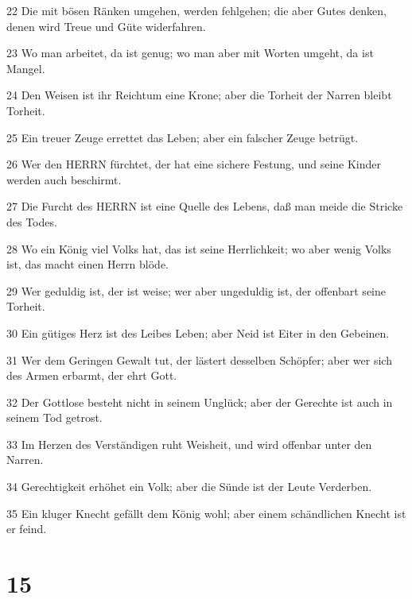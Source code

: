 \par 22 Die mit bösen Ränken umgehen, werden fehlgehen; die aber Gutes denken, denen wird Treue und Güte widerfahren.
\par 23 Wo man arbeitet, da ist genug; wo man aber mit Worten umgeht, da ist Mangel.
\par 24 Den Weisen ist ihr Reichtum eine Krone; aber die Torheit der Narren bleibt Torheit.
\par 25 Ein treuer Zeuge errettet das Leben; aber ein falscher Zeuge betrügt.
\par 26 Wer den HERRN fürchtet, der hat eine sichere Festung, und seine Kinder werden auch beschirmt.
\par 27 Die Furcht des HERRN ist eine Quelle des Lebens, daß man meide die Stricke des Todes.
\par 28 Wo ein König viel Volks hat, das ist seine Herrlichkeit; wo aber wenig Volks ist, das macht einen Herrn blöde.
\par 29 Wer geduldig ist, der ist weise; wer aber ungeduldig ist, der offenbart seine Torheit.
\par 30 Ein gütiges Herz ist des Leibes Leben; aber Neid ist Eiter in den Gebeinen.
\par 31 Wer dem Geringen Gewalt tut, der lästert desselben Schöpfer; aber wer sich des Armen erbarmt, der ehrt Gott.
\par 32 Der Gottlose besteht nicht in seinem Unglück; aber der Gerechte ist auch in seinem Tod getrost.
\par 33 Im Herzen des Verständigen ruht Weisheit, und wird offenbar unter den Narren.
\par 34 Gerechtigkeit erhöhet ein Volk; aber die Sünde ist der Leute Verderben.
\par 35 Ein kluger Knecht gefällt dem König wohl; aber einem schändlichen Knecht ist er feind.

\chapter{15}

